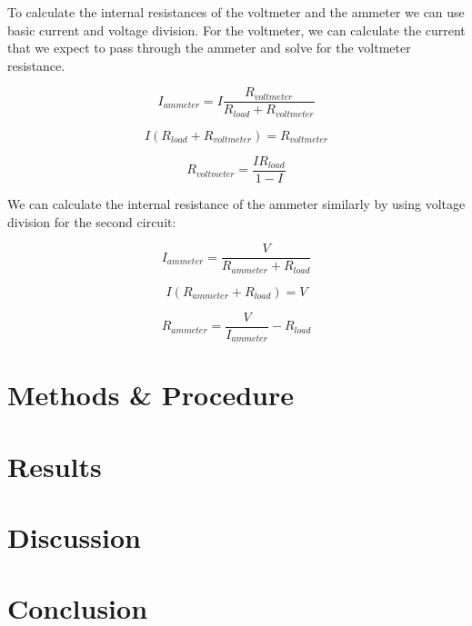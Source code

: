 \documentclass{article} %
\begin{document}
\begin{multicols}{2}
To calculate the internal resistances of the voltmeter and the ammeter we can use basic current and voltage division.
For the voltmeter, we can calculate the current that we expect to pass through the ammeter and solve for the voltmeter resistance.

\[
I_{ammeter} = I \frac{R_{voltmeter}}{R_{load} + R_{voltmeter}}
\]

\[
I(R_{load} + R_{voltmeter}) = R_{voltmeter}
\]

\[
R_{voltmeter} = \frac{I R_{load}}{1 - I}
\]

We can calculate the internal resistance of the ammeter similarly by using voltage division for the second circuit:

\[
I_{ammeter} = \frac{V}{R_{ammeter} + R_{load}}
\]

\[
I(R_{ammeter} + R_{load}) = V
\]

\[
R_{ammeter} = \frac{V}{I_{ammeter}} - R_{load}
\]

\section{Methods \& Procedure}

\section{Results}

\section{Discussion}

\section{Conclusion}

\label{last_page}

\newpage



\end{multicols}
\end{document}
